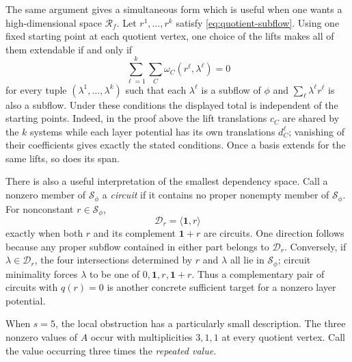 \documentclass[11pt,a4paper]{article}
\theoremstyle{definition}
\theoremstyle{remark}
\begin{document}
The same argument gives a simultaneous form which is useful when one wants a high-dimensional space $\mathcal R_f$.  Let $r^1,\ldots,r^k$ satisfy \eqref{eq:quotient-subflow}.  Using one fixed starting point at each quotient vertex, one choice of the lifts makes all of them extendable if and only if
\[
 \sum_{\ell=1}^k\sum_C\omega_C(r^\ell,\lambda^\ell)=0
\]
for every tuple $(\lambda^1,\ldots,\lambda^k)$ such that each $\lambda^\ell$ is a subflow of $\phi$ and $\sum_\ell\lambda^\ell r^\ell$ is also a subflow.  Under these conditions the displayed total is independent of the starting points.  Indeed, in the proof above the lift translations $c_C$ are shared by the $k$ systems while each layer potential has its own translations $d_C^\ell$; vanishing of their coefficients gives exactly the stated conditions.  Once a basis extends for the same lifts, so does its span.

There is also a useful interpretation of the smallest dependency space.  Call a nonzero member of $\mathcal S_\phi$ a \emph{circuit} if it contains no proper nonempty member of $\mathcal S_\phi$.  For nonconstant $r\in\mathcal S_\phi$,
\[
 \mathcal D_r=\langle\boldsymbol1,r\rangle
\]
exactly when both $r$ and its complement $\boldsymbol1+r$ are circuits.  One direction follows because any proper subflow contained in either part belongs to $\mathcal D_r$.  Conversely, if $\lambda\in\mathcal D_r$, the four intersections determined by $r$ and $\lambda$ all lie in $\mathcal S_\phi$; circuit minimality forces $\lambda$ to be one of $0,\boldsymbol1,r,\boldsymbol1+r$.  Thus a complementary pair of circuits with $q(r)=0$ is another concrete sufficient target for a nonzero layer potential.

When $s=5$, the local obstruction has a particularly small description.  The three nonzero values of $A$ occur with multiplicities $3,1,1$ at every quotient vertex.  Call the value occurring three times the \emph{repeated value}.
\end{document}
